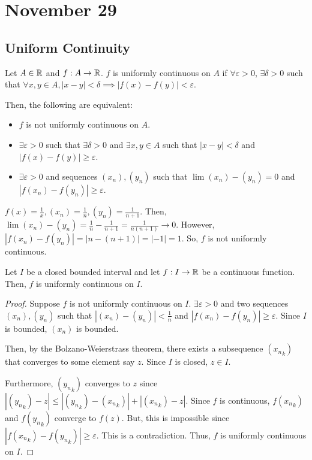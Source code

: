 \section{November 29}

\subsection{Uniform Continuity}
\begin{definition}
    Let $A \in \mathbb{R}$ and $f: A \to \mathbb{R}$. $f$ is uniformly continuous on $A$ if $\forall \varepsilon > 0$, $\exists \delta > 0$ such that $\forall x, y \in A, |x - y| < \delta \implies |f(x) - f(y)| < \varepsilon$.
\end{definition}

\noindent Then, the following are equivalent:
\begin{itemize}
    \item $f$ is not uniformly continuous on $A$.
    \item $\exists \varepsilon > 0$ such that $\exists \delta > 0$ and $\exists x, y \in A$ such that $|x - y| < \delta$ and $|f(x) - f(y)| \geq \varepsilon$.
    \item $\exists \varepsilon > 0$ and sequences $(x_n), (y_n)$ such that $\lim (x_n) - (y_n) = 0$ and $|f(x_n) - f(y_n)| \geq \varepsilon$.
\end{itemize}
\begin{example}
    $f(x) = \frac{1}{x}, (x_n) = \frac{1}{n}, (y_n) = \frac{1}{n + 1}$. Then, $\lim (x_n) - (y_n) = \frac{1}{n} - \frac{1}{n + 1} = \frac{1}{n(n + 1)} \to 0$. However, $|f(x_n) - f(y_n)| = |n - (n + 1)| = |-1| = 1$. So, $f$ is not uniformly continuous.
\end{example}

\begin{theorem}
    Let $I$ be a closed bounded interval and let $f: I \to \mathbb{R}$ be a continuous function. Then, $f$ is uniformly continuous on $I$.
\end{theorem}
\begin{proof}
    Suppose $f$ is not uniformly continuous on $I$. $\exists \varepsilon > 0$ and two sequences $(x_n), (y_n)$ such that $|(x_n) - (y_n)| < \frac{1}{n}$ and $|f(x_n) - f(y_n)| \geq \varepsilon$. Since $I$ is bounded, $(x_n)$ is bounded. 
    
    Then, by the Bolzano-Weierstrass theorem, there exists a subsequence $({x_n}_k)$ that converges to some element say $z$. Since $I$ is closed, $z \in I$. 
    
    Furthermore, $({y_n}_k)$ converges to $z$ since $|({y_n}_k) - z| \leq |({y_n}_k) - ({x_n}_k)| + |({x_n}_k) - z|$. Since $f$ is continuous, $f({x_n}_k)$ and $f({y_n}_k)$ converge to $f(z)$. But, this is impossible since $|f({x_n}_k) - f({y_n}_k)| \geq \varepsilon$. This is a contradiction. Thus, $f$ is uniformly continuous on $I$.
\end{proof}